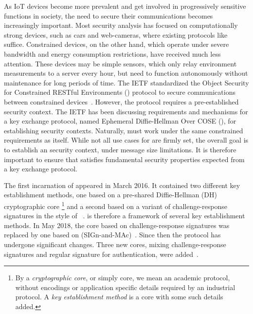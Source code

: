 \documentclass[runningheads]{llncs}
\begin{document}
As IoT devices become more prevalent and get involved in progressively sensitive
functions in society, the need to secure their communications
becomes increasingly important.
%
Most security analysis has focused on computationally
strong devices, such as cars and web-cameras, where existing protocols like
\mDandTls{} suffice.
%
Constrained devices, on the other hand, which operate under severe
bandwidth and energy consumption restrictions, have received much less
attention.
%
These devices may be simple sensors, which only relay environment
measurements to a server every hour, but need to function autonomously without
maintenance for long periods of time.
%
The IETF standardized the Object Security for
Constrained RESTful Environments (\mOscore{}) protocol to secure communications
between constrained devices~\cite{rfc8613}.
%
However, the \mOscore{} protocol requires a pre-established security context.
%
The IETF has been discussing requirements and mechanisms for a key
exchange protocol, named Ephemeral Diffie-Hellman Over COSE (\mEdhoc), for
establishing \mOscore{} security contexts.
%
Naturally, \mEdhoc{} must work under the same constrained requirements as
\mOscore{} itself.
%
While not all use cases for \mEdhoc{} are firmly set, the overall goal is to
establish an \mOscore{} security context, under message size limitations.
%
It is therefore important to ensure that \mEdhoc{} satisfies fundamental
security properties expected from a key exchange protocol.
%

The first incarnation of \mEdhoc{} appeared in March 2016.
%
It contained two different key establishment methods, one based on a
pre-shared Diffie-Hellman (DH) cryptographic core%
\footnote{By a \emph{cryptographic core}, or simply core, we mean an academic protocol,
without encodings or application specific details required by an industrial
protocol.
%
A \emph{key establishment method} is a core with some such details added.
}
and a second based on a
variant of challenge-response signatures in the style of
\mOptls{}~\cite{DBLP:conf/eurosp/KrawczykW16}.
%
\mEdhoc{} is therefore a framework of several key establishment methods.
%
In May 2018, the core based on challenge-response signatures was replaced by
one based on \mSigma{} (SIGn-and-MAc)~\cite{sigma,bruni-analysis-selander-ace-cose-ecdhe-08}.
%
Since then the protocol has undergone significant changes.
%
Three new cores, mixing challenge-response signatures and regular signature for
authentication, were added~\cite{our-analysis-selander-lake-edhoc-00}.
%
\end{document}
